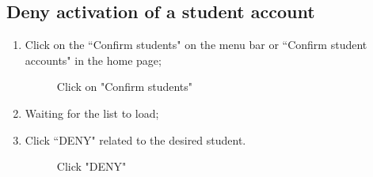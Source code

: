 \documentclass[ManualeUtente]{subfiles}
\begin{document}
\subsection{Deny activation of a student account}
\begin{enumerate}
	\item Click on the \textquotedblleft Confirm students" on the menu bar or \textquotedblleft Confirm student accounts" in the home page;
	\begin{figure}[H]
		\centering
		\caption{Click on "Confirm students"}
		\label{fig:Click on "Confirm students"}
	\end{figure}
	\item Waiting for the list to load;
	\item Click \textquotedblleft DENY" related to the desired student.
	\begin{figure}[H]
		\centering
		\caption{Click "DENY"}
		\label{fig:Click "DENY"}
	\end{figure}
\end{enumerate}
\end{document}
